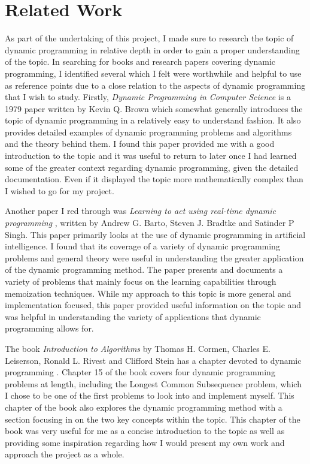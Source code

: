 \section{Related Work}
As part of the undertaking of this project, I made sure to research the topic of dynamic programming in relative depth in order to gain a proper understanding of the topic. In searching for books and research papers covering dynamic programming, I identified several which I felt were worthwhile and helpful to use as reference points due to a close relation to the aspects of dynamic programming that I wish to study. Firstly, \textit{Dynamic Programming in Computer Science}\cite{DPiCS} is a 1979 paper written by Kevin Q. Brown which somewhat generally introduces the topic of dynamic programming in a relatively easy to understand fashion. It also provides detailed examples of dynamic programming problems and algorithms and the theory behind them. I found this paper provided me with a good introduction to the topic and it was useful to return to later once I had learned some of the greater context regarding dynamic programming, given the detailed documentation. Even if it displayed the topic more mathematically complex than I wished to go for my project.
\smallbreak

Another paper I red through was \textit{Learning to act using real-time dynamic programming} \cite{learning2act}, written by Andrew G. Barto, Steven J. Bradtke and Satinder P Singh. This paper primarily looks at the use of dynamic programming in artificial intelligence. I found that its coverage of a variety of dynamic programming problems and general theory were useful in understanding the greater application of the dynamic programming method. The paper presents and documents a variety of problems that mainly focus on the learning capabilities through memoization techniques. While my approach to this topic is more general and implementation focused, this paper provided useful information on the topic and was helpful in understanding the variety of applications that dynamic programming allows for. 
\smallbreak

The book \textit{Introduction to Algorithms} by Thomas H. Cormen, Charles E. Leiserson, Ronald L. Rivest and Clifford Stein has a chapter devoted to dynamic programming \cite{IntroAlgo}. Chapter 15 of the book covers four dynamic programming problems at length, including the Longest Common Subsequence problem, which I chose to be one of the first problems to look into and implement myself. This chapter of the book also explores the dynamic programming method with a section focusing in on the two key concepts within the topic. This chapter of the book was very useful for me as a concise introduction to the topic as well as providing some inspiration regarding how I would present my own work and approach the project as a whole.
\smallbreak

